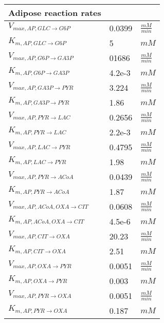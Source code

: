 \begin{supertabular}{lll}
\textbf{Adipose reaction rates} \\ \hline
$V_{max, AP,GLC \xrightarrow[]{} G6P}$ & 0.0399 & $\frac{mM}{min}$       \\ \hline
$K_{m, AP,GLC \xrightarrow[]{} G6P}$ & 5 & $mM$   \\ \hline

$V_{max, AP,G6P \xrightarrow[]{} GA3P}$ & 01686 & $\frac{mM}{min}$       \\ \hline
$K_{m, AP,G6P \xrightarrow[]{} GA3P}$ & 4.2e-3 & $mM$   \\ \hline

$V_{max, AP,GA3P \xrightarrow[]{} PYR}$ & 3.224 & $\frac{mM}{min}$       \\ 
$K_{m, AP,GA3P \xrightarrow[]{} PYR}$ & 1.86 & $mM$   \\ \hline

$V_{max, AP,PYR \xrightarrow[]{} LAC}$ & 0.2656 & $\frac{mM}{min}$       \\ \hline
$K_{m, AP,PYR \xrightarrow[]{} LAC}$ & 2.2e-3 & $mM$   \\ \hline

$V_{max, AP,LAC \xrightarrow[]{} PYR}$ & 0.4795 & $\frac{mM}{min}$       \\ \hline
$K_{m, AP,LAC \xrightarrow[]{} PYR}$ & 1.98 & $mM$   \\ \hline

$V_{max, AP,PYR \xrightarrow[]{} ACoA}$ & 0.0439 & $\frac{mM}{min}$       \\ \hline
$K_{m, AP,PYR \xrightarrow[]{} ACoA}$ & 1.87 & $mM$   \\ \hline

$V_{max, AP,ACoA , OXA \xrightarrow[]{} CIT}$ & 0.0608 & $\frac{mM}{min}$       \\ \hline
$K_{m, AP,ACoA , OXA \xrightarrow[]{} CIT}$ & 4.5e-6 & $mM$   \\ \hline

$V_{max, AP,CIT \xrightarrow[]{} OXA}$ & 20.23 & $\frac{mM}{min}$       \\ \hline
$K_{m, AP,CIT \xrightarrow[]{} OXA}$ & 2.51 & $mM$   \\ \hline

$V_{max, AP,OXA \xrightarrow[]{} PYR}$ & 0.0051 & $\frac{mM}{min}$       \\ \hline
$K_{m, AP,OXA \xrightarrow[]{} PYR}$ & 0.003 & $mM$   \\ \hline

$V_{max, AP,PYR \xrightarrow[]{} OXA}$ & 0.0051 & $\frac{mM}{min}$       \\ \hline
$K_{m, AP,PYR \xrightarrow[]{} OXA}$ & 0.187 & $mM$   \\ \hline


\end{supertabular}
